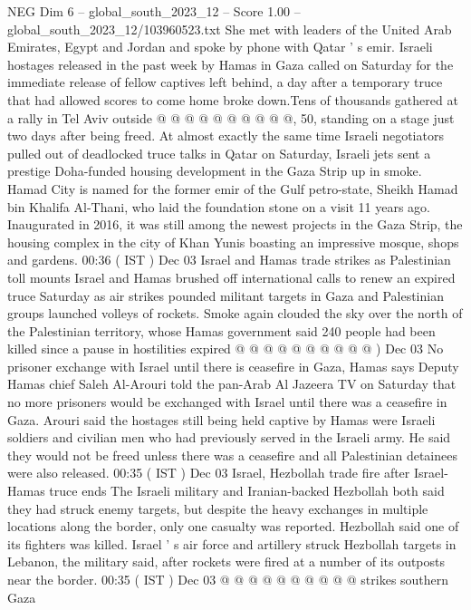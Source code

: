\begin{textsample}{NEG Dim 6 – global\_south\_2023\_12 – Score 1.00 – global\_south\_2023\_12/103960523.txt}
She met with leaders of the United Arab Emirates, Egypt and Jordan and spoke by phone with Qatar ' s emir.
Israeli hostages released in the past week by Hamas in Gaza called on Saturday for the immediate release of fellow captives left behind, a day after a temporary truce that had allowed scores to come home broke down.Tens of thousands gathered at a rally in Tel Aviv outside @ @ @ @ @ @ @ @ @ @, 50, standing on a stage just two days after being freed.
At almost exactly the same time Israeli negotiators pulled out of deadlocked truce talks in Qatar on Saturday, Israeli jets sent a prestige Doha-funded housing development in the Gaza Strip up in smoke.
Hamad City is named for the former emir of the Gulf petro-state, Sheikh Hamad bin Khalifa Al-Thani, who laid the foundation stone on a visit 11 years ago.
Inaugurated in 2016, it was still among the newest projects in the Gaza Strip, the housing complex in the city of Khan Yunis boasting an impressive mosque, shops and gardens. 00:36 ( IST ) Dec 03 Israel and Hamas trade strikes as Palestinian toll mounts Israel and Hamas brushed off international calls to renew an expired truce Saturday as air strikes pounded militant targets in Gaza and Palestinian groups launched volleys of rockets.
Smoke again clouded the sky over the north of the Palestinian territory, whose Hamas government said 240 people had been killed since a pause in hostilities expired @ @ @ @ @ @ @ @ @ @ ) Dec 03 No prisoner exchange with Israel until there is ceasefire in Gaza, Hamas says Deputy Hamas chief Saleh Al-Arouri told the pan-Arab Al Jazeera TV on Saturday that no more prisoners would be exchanged with Israel until there was a ceasefire in Gaza.
Arouri said the hostages still being held captive by Hamas were Israeli soldiers and civilian men who had previously served in the Israeli army.
He said they would not be freed unless there was a ceasefire and all Palestinian detainees were also released. 00:35 ( IST ) Dec 03 Israel, Hezbollah trade fire after Israel-Hamas truce ends The Israeli military and Iranian-backed Hezbollah both said they had struck enemy targets, but despite the heavy exchanges in multiple locations along the border, only one casualty was reported.
Hezbollah said one of its fighters was killed.
Israel ' s air force and artillery struck Hezbollah targets in Lebanon, the military said, after rockets were fired at a number of its outposts near the border. 00:35 ( IST ) Dec 03 @ @ @ @ @ @ @ @ @ @ strikes southern Gaza

\end{textsample}
